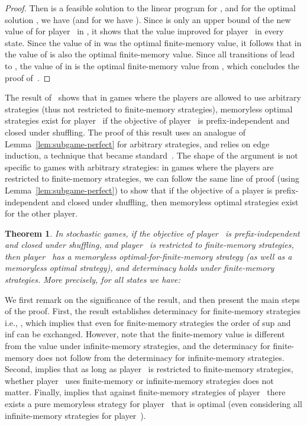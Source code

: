 \documentclass{article}
\newtheorem{theorem}{Theorem}
\begin{document}
\begin{proof}
\noindent Then  is a feasible solution to the linear program for ,
and for the optimal solution , we have  (and
for  we have ). Since 
 is only an upper bound of the new value of  for player~ in ,
it shows that the value improved for player~ in every state.  
Since the value of  in  was the optimal finite-memory value,
it follows that in  the value of  is also the optimal finite-memory value.
Since all transitions of  lead to , the value
of  in  is the optimal finite-memory value from ,
which concludes the proof of~.
\end{proof}


The result of~\cite[Theorem~5.2]{GK14} shows that in games where the players 
are allowed to use arbitrary strategies (thus not restricted to finite-memory 
strategies), memoryless optimal strategies exist for player~ if the objective 
of player~ is prefix-independent and closed under shuffling. 
The proof of this result uses an analogue of Lemma~\ref{lem:subgame-perfect}
for arbitrary strategies, and relies on edge induction, a technique that
became standard~\cite{CD12,GK14,GZ05,Kop06}. 
The shape of the argument is not specific to games with arbitrary strategies:
in games where the players are restricted to finite-memory strategies, 
we can follow the same line of proof (using Lemma~\ref{lem:subgame-perfect}) 
to show that if the objective of a player is prefix-independent and 
closed under shuffling, then memoryless optimal strategies exist for the other player.


\begin{theorem}\label{theo:half-memoryless}
In stochastic games, if the objective  of player~ is prefix-independent and
closed under shuffling, and player~ is restricted to finite-memory strategies,
then player~ has a memoryless optimal-for-finite-memory strategy (as well as a 
memoryless optimal strategy), and determinacy holds under finite-memory strategies.
More precisely, for all states  we have:


\end{theorem}

\smallskip{}
We first remark on the significance of the result, and then present the main steps of the 
proof.
First, the result establishes determinacy for finite-memory strategies 
i.e., , which implies that even for finite-memory strategies
the order of sup and inf can be exchanged. 
However, note that the finite-memory value is different from the value under infinite-memory 
strategies, and the determinacy for finite-memory does not follow from the determinacy
for infinite-memory strategies.
Second, 
implies that as long as player~ is restricted to finite-memory strategies, whether 
player~ uses finite-memory or infinite-memory strategies does not matter.
Finally, 
implies that against finite-memory strategies of player~ there exists a pure memoryless
strategy for player~ that is optimal (even considering all infinite-memory strategies 
for player~). 
\end{document}
